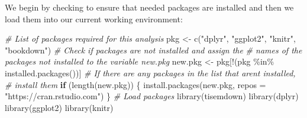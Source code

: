 \documentclass[12pt,oneside]{tisemthesis}
\newenvironment{Shaded}{\begin{snugshade}}{\end{snugshade}}
\newcommand{\AttributeTok}[1]{\textcolor[rgb]{0.77,0.63,0.00}{#1}}
\newcommand{\CommentTok}[1]{\textcolor[rgb]{0.56,0.35,0.01}{\textit{#1}}}
\newcommand{\ControlFlowTok}[1]{\textcolor[rgb]{0.13,0.29,0.53}{\textbf{#1}}}
\newcommand{\FunctionTok}[1]{\textcolor[rgb]{0.00,0.00,0.00}{#1}}
\newcommand{\NormalTok}[1]{#1}
\newcommand{\OtherTok}[1]{\textcolor[rgb]{0.56,0.35,0.01}{#1}}
\newcommand{\SpecialCharTok}[1]{\textcolor[rgb]{0.00,0.00,0.00}{#1}}
\newcommand{\StringTok}[1]{\textcolor[rgb]{0.31,0.60,0.02}{#1}}
\begin{document}
We begin by checking to ensure that needed packages are installed and then we load them into our current working environment:
\begin{Shaded}
\begin{Highlighting}[]
\CommentTok{\# List of packages required for this analysis}
\NormalTok{pkg }\OtherTok{\textless{}{-}} \FunctionTok{c}\NormalTok{(}\StringTok{"dplyr"}\NormalTok{, }\StringTok{"ggplot2"}\NormalTok{, }\StringTok{"knitr"}\NormalTok{, }\StringTok{"bookdown"}\NormalTok{)}
\CommentTok{\# Check if packages are not installed and assign the}
\CommentTok{\# names of the packages not installed to the variable new.pkg}
\NormalTok{new.pkg }\OtherTok{\textless{}{-}}\NormalTok{ pkg[}\SpecialCharTok{!}\NormalTok{(pkg }\SpecialCharTok{\%in\%} \FunctionTok{installed.packages}\NormalTok{())]}
\CommentTok{\# If there are any packages in the list that aren\textquotesingle{}t installed,}
\CommentTok{\# install them}
\ControlFlowTok{if}\NormalTok{ (}\FunctionTok{length}\NormalTok{(new.pkg)) \{}
  \FunctionTok{install.packages}\NormalTok{(new.pkg, }\AttributeTok{repos =} \StringTok{"https://cran.rstudio.com"}\NormalTok{)}
\NormalTok{\}}
\CommentTok{\# Load packages}
\FunctionTok{library}\NormalTok{(tisemdown)}
\FunctionTok{library}\NormalTok{(dplyr)}
\FunctionTok{library}\NormalTok{(ggplot2)}
\FunctionTok{library}\NormalTok{(knitr)}
\end{Highlighting}
\end{Shaded}
\clearpage
\end{document}
